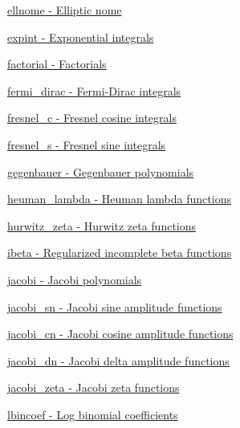 \begin{DoxyItemize}
\item \hyperlink{group__gnu__math__spec__func_ga7bfb34f8b5c0ed7c72040f9cb7034bba}{ellnome -\/ Elliptic nome}
\item \hyperlink{group__gnu__math__spec__func_ga2cfc699129ceac9cfed87c61e6dc0e08}{expint -\/ Exponential integrals}
\item \hyperlink{group__gnu__math__spec__func_ga48bc268969bfc03eaeaf4bfd457bb25c}{factorial -\/ Factorials}
\item \hyperlink{group__gnu__math__spec__func_ga47dd583a4f3a19f797a5e074e357ba36}{fermi\+\_\+dirac -\/ Fermi-\/\+Dirac integrals}
\item \hyperlink{group__gnu__math__spec__func_gab6a34ce43bad4e8181ad9c40aebb9ada}{fresnel\+\_\+c -\/ Fresnel cosine integrals}
\item \hyperlink{group__gnu__math__spec__func_gaaf6e2b182d0abde6fde72c0b8b9f959c}{fresnel\+\_\+s -\/ Fresnel sine integrals}
\item \hyperlink{group__gnu__math__spec__func_ga793df814fb4e1b60e926ead0be14cc87}{gegenbauer -\/ Gegenbauer polynomials}
\item \hyperlink{group__gnu__math__spec__func_gab73b2a75a662785fa102926dca3be59f}{heuman\+\_\+lambda -\/ Heuman lambda functions}
\item \hyperlink{group__gnu__math__spec__func_ga19b3014d94dd102c59a5c7776474be41}{hurwitz\+\_\+zeta -\/ Hurwitz zeta functions}
\item \hyperlink{group__gnu__math__spec__func_gae9a18423e325171ca0c61b411258fa65}{ibeta -\/ Regularized incomplete beta functions}
\item \hyperlink{group__gnu__math__spec__func_ga3dea9ec3774ee5db50276597bbfb0afa}{jacobi -\/ Jacobi polynomials}
\item \hyperlink{group__gnu__math__spec__func_ga5e39ec723669e132e27980dfdf766c19}{jacobi\+\_\+sn -\/ Jacobi sine amplitude functions}
\item \hyperlink{group__gnu__math__spec__func_ga51512996a910489b4554daa7507a48f1}{jacobi\+\_\+cn -\/ Jacobi cosine amplitude functions}
\item \hyperlink{group__gnu__math__spec__func_ga4c2e5ff17abaab5217d4dbcbfd7366d8}{jacobi\+\_\+dn -\/ Jacobi delta amplitude functions}
\item \hyperlink{group__gnu__math__spec__func_gafe1fc209cfe90ceee3b42e077a922045}{jacobi\+\_\+zeta -\/ Jacobi zeta functions}
\item \hyperlink{group__gnu__math__spec__func_gab6a2243313b6286cbd466c96fc7f69ed}{lbincoef -\/ Log binomial coefficients}

\end{DoxyItemize}
